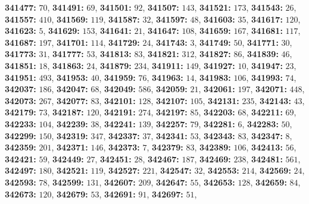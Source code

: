 \textsf{\bfseries 341477:} $70$, \textsf{\bfseries 341491:} $69$, \textsf{\bfseries 341501:} $92$, \textsf{\bfseries 341507:} $143$, \textsf{\bfseries 341521:} $173$, \textsf{\bfseries 341543:} $26$, \textsf{\bfseries 341557:} $410$, \textsf{\bfseries 341569:} $119$, \textsf{\bfseries 341587:} $32$, \textsf{\bfseries 341597:} $48$, \textsf{\bfseries 341603:} $35$, \textsf{\bfseries 341617:} $120$, \textsf{\bfseries 341623:} $5$, \textsf{\bfseries 341629:} $153$, \textsf{\bfseries 341641:} $21$, \textsf{\bfseries 341647:} $108$, \textsf{\bfseries 341659:} $167$, \textsf{\bfseries 341681:} $117$, \textsf{\bfseries 341687:} $197$, \textsf{\bfseries 341701:} $114$, \textsf{\bfseries 341729:} $24$, \textsf{\bfseries 341743:} $3$, \textsf{\bfseries 341749:} $50$, \textsf{\bfseries 341771:} $30$, \textsf{\bfseries 341773:} $31$, \textsf{\bfseries 341777:} $53$, \textsf{\bfseries 341813:} $83$, \textsf{\bfseries 341821:} $312$, \textsf{\bfseries 341827:} $86$, \textsf{\bfseries 341839:} $46$, \textsf{\bfseries 341851:} $18$, \textsf{\bfseries 341863:} $24$, \textsf{\bfseries 341879:} $234$, \textsf{\bfseries 341911:} $149$, \textsf{\bfseries 341927:} $10$, \textsf{\bfseries 341947:} $23$, \textsf{\bfseries 341951:} $493$, \textsf{\bfseries 341953:} $40$, \textsf{\bfseries 341959:} $76$, \textsf{\bfseries 341963:} $14$, \textsf{\bfseries 341983:} $106$, \textsf{\bfseries 341993:} $74$, \textsf{\bfseries 342037:} $186$, \textsf{\bfseries 342047:} $68$, \textsf{\bfseries 342049:} $586$, \textsf{\bfseries 342059:} $21$, \textsf{\bfseries 342061:} $197$, \textsf{\bfseries 342071:} $448$, \textsf{\bfseries 342073:} $267$, \textsf{\bfseries 342077:} $83$, \textsf{\bfseries 342101:} $128$, \textsf{\bfseries 342107:} $105$, \textsf{\bfseries 342131:} $235$, \textsf{\bfseries 342143:} $43$, \textsf{\bfseries 342179:} $73$, \textsf{\bfseries 342187:} $120$, \textsf{\bfseries 342191:} $274$, \textsf{\bfseries 342197:} $85$, \textsf{\bfseries 342203:} $68$, \textsf{\bfseries 342211:} $69$, \textsf{\bfseries 342233:} $104$, \textsf{\bfseries 342239:} $38$, \textsf{\bfseries 342241:} $139$, \textsf{\bfseries 342257:} $79$, \textsf{\bfseries 342281:} $6$, \textsf{\bfseries 342283:} $50$, \textsf{\bfseries 342299:} $150$, \textsf{\bfseries 342319:} $347$, \textsf{\bfseries 342337:} $37$, \textsf{\bfseries 342341:} $53$, \textsf{\bfseries 342343:} $83$, \textsf{\bfseries 342347:} $8$, \textsf{\bfseries 342359:} $201$, \textsf{\bfseries 342371:} $146$, \textsf{\bfseries 342373:} $7$, \textsf{\bfseries 342379:} $83$, \textsf{\bfseries 342389:} $106$, \textsf{\bfseries 342413:} $56$, \textsf{\bfseries 342421:} $59$, \textsf{\bfseries 342449:} $27$, \textsf{\bfseries 342451:} $28$, \textsf{\bfseries 342467:} $187$, \textsf{\bfseries 342469:} $238$, \textsf{\bfseries 342481:} $561$, \textsf{\bfseries 342497:} $180$, \textsf{\bfseries 342521:} $119$, \textsf{\bfseries 342527:} $221$, \textsf{\bfseries 342547:} $32$, \textsf{\bfseries 342553:} $214$, \textsf{\bfseries 342569:} $24$, \textsf{\bfseries 342593:} $78$, \textsf{\bfseries 342599:} $131$, \textsf{\bfseries 342607:} $209$, \textsf{\bfseries 342647:} $55$, \textsf{\bfseries 342653:} $128$, \textsf{\bfseries 342659:} $84$, \textsf{\bfseries 342673:} $120$, \textsf{\bfseries 342679:} $53$, \textsf{\bfseries 342691:} $91$, \textsf{\bfseries 342697:} $51$, 
